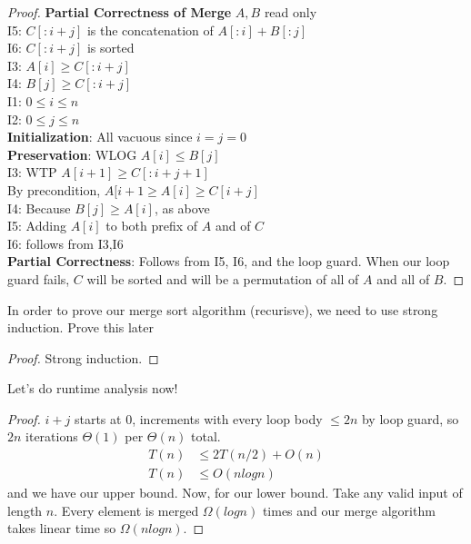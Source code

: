 \documentclass[11pt]{article}
\begin{document}
\begin{proof}
    \textbf{Partial Correctness of Merge} $A,B$ read only \\
    I5: $C[:i+j]$ is the concatenation of $A[:i]+B[:j]$ \\
    I6: $C[:i+j]$ is sorted \\
    I3: $A[i] \geq C[:i+j]$ \\
    I4: $B[j] \geq C[:i+j]$ \\
    I1: $0 \leq i \leq n$ \\
    I2: $0 \leq j \leq n$ \\
    \textbf{Initialization}: All vacuous since $i=j=0$ \\
    \textbf{Preservation}: WLOG $A[i] \leq B[j]$ \\
    I3: WTP $A[i+1] \geq C[:i+j+1]$ \\
    By precondition, $A[i+1 \geq A[i] \geq C[i+j] $ \\
    I4: Because $B[j] \geq A[i]$, as above \\
    I5: Adding $A[i]$ to both prefix of $A$ and of $C$ \\
    I6: follows from I3,I6 \\
    \textbf{Partial Correctness}: Follows from I5, I6, and the loop guard. When our loop guard fails, $C$ will be sorted and will be a permutation of all of $A$ and all of $B$. 
\end{proof}

In order to prove our merge sort algorithm (recurisve), we need to use strong induction. Prove this later
\begin{proof}
    Strong induction.
\end{proof}

Let's do runtime analysis now!
\begin{proof}
    $i+j$ starts at $0$, increments with every loop body $\leq 2n$ by loop guard, so $2n$ iterations $\Theta(1)$ per $\Theta(n)$ total.
    \begin{align*}
        T(n) &\leq 2T(n/2)+O(n) \\
        T(n) &\leq O(nlogn)
    \end{align*}
    and we have our upper bound. Now, for our lower bound. Take any valid input of length $n$. Every element is merged $\Omega(logn)$ times and our merge algorithm takes linear time so $\Omega(nlogn)$.
\end{proof}
\end{document}
